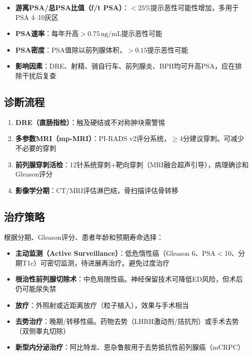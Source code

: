 \begin{enumerate}
\begin{itemize}[leftmargin=2cm]
	\item \textbf{游离PSA/总PSA比值（f/t PSA）}：$<25\%$提示恶性可能性增加，多用于PSA 4--10灰区
	\item \textbf{PSA速率}：每年升高$>0.75\,\mathrm{ng/mL}$提示恶性可能
	\item \textbf{PSA密度}：PSA值除以前列腺体积，$>0.15$提示恶性可能
	\item \textbf{影响因素}：DRE、射精、骑自行车、前列腺炎、BPH均可升高PSA，应在排除干扰后复查
\end{itemize}

\subsection{诊断流程}

\begin{enumerate}
	\item \textbf{DRE（直肠指检）}：触及硬结或不对称肿块需警惕
	\item \textbf{多参数MRI（mp-MRI）}：PI-RADS v2评分系统，$\geq$4分建议穿刺。可减少不必要的穿刺
	\item \textbf{前列腺穿刺活检}：12针系统穿刺+靶向穿刺（MRI融合超声引导），病理确诊和Gleason评分
	\item \textbf{影像学分期}：CT/MRI评估淋巴结，骨扫描评估骨转移
\end{enumerate}

\subsection{治疗策略}

根据分期、Gleason评分、患者年龄和预期寿命选择：

\begin{itemize}[leftmargin=2cm]
	\item \textbf{主动监测（Active Surveillance）}：低危惰性癌（Gleason 6、PSA$<$10、分期T1c）可密切监测，待进展再治疗。避免过度治疗
	\item \textbf{根治性前列腺切除术}：中危局限性癌。神经保留技术可降低ED风险，但术后仍可能尿失禁
	\item \textbf{放疗}：外照射或近距离放疗（粒子植入），效果与手术相当
	\item \textbf{去势治疗}：晚期/转移性癌。药物去势（LHRH激动剂/拮抗剂）或手术去势（双侧睾丸切除）
	\item \textbf{新型内分泌治疗}：阿比特龙、恩杂鲁胺用于去势抵抗性前列腺癌（mCRPC）
\end{itemize}


\end{enumerate}
